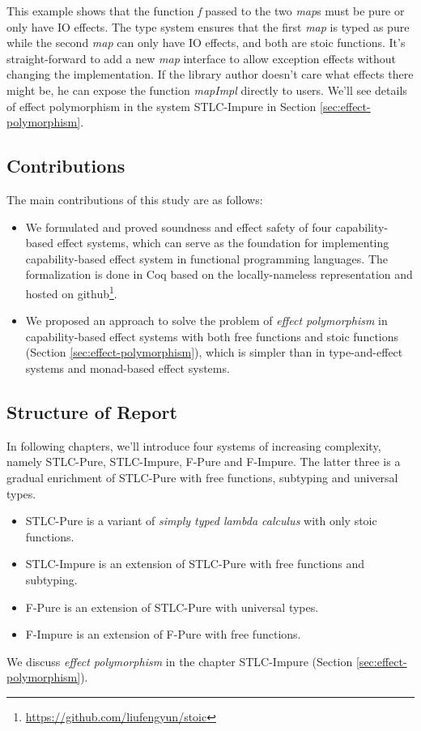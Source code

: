 This example shows that the function \emph{f} passed to the two
\emph{map}s must be pure or only have IO effects. The type system
ensures that the first \emph{map} is typed as pure while the second
\emph{map} can only have IO effects, and both are stoic
functions. It's straight-forward to add a new \emph{map} interface to
allow exception effects without changing the implementation. If the
library author doesn't care what effects there might be, he can expose
the function \emph{mapImpl} directly to users.  We'll see details of
effect polymorphism in the system STLC-Impure in Section
\ref{sec:effect-polymorphism}.

\subsection{Contributions}

The main contributions of this study are as follows:

\begin{itemize}
\item We formulated and proved soundness and effect safety of four
  capability-based effect systems, which can serve as the foundation
  for implementing capability-based effect system in functional
  programming languages. The formalization is done in Coq based on the
  locally-nameless representation\cite{chargueraud-11-ln} and hosted
  on github\footnote{\url{https://github.com/liufengyun/stoic}}.
\item We proposed an approach to solve the problem of \emph{effect
    polymorphism} in capability-based effect systems with both free
  functions and stoic functions (Section
  \ref{sec:effect-polymorphism}), which is simpler than in
  type-and-effect systems and monad-based effect systems.
\end{itemize}

\subsection{Structure of Report}

In following chapters, we'll introduce four systems of increasing
complexity, namely STLC-Pure, STLC-Impure, F-Pure and F-Impure. The
latter three is a gradual enrichment of STLC-Pure with free functions,
subtyping and universal types.

\begin{itemize}
\item STLC-Pure is a variant of \emph{simply typed lambda calculus}
  with only stoic functions.
\item STLC-Impure is an extension of STLC-Pure with free functions and subtyping.
\item F-Pure is an extension of STLC-Pure with universal types.
\item F-Impure is an extension of F-Pure with free functions.
\end{itemize}

We discuss \emph{effect polymorphism} in the chapter STLC-Impure
(Section \ref{sec:effect-polymorphism}).
